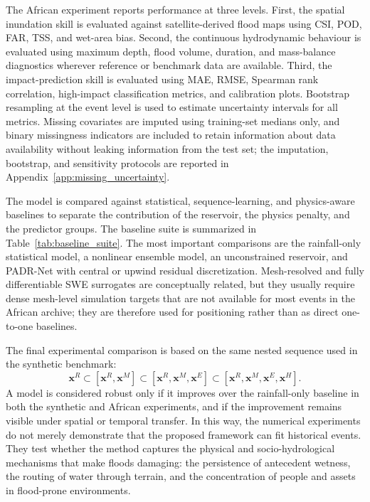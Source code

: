 \documentclass[pdflatex,sn-mathphys-ay]{sn-jnl}
\theoremstyle{thmstyleone}
\begin{document}
The African experiment reports performance at three levels.  First, the
spatial inundation skill is evaluated against satellite-derived flood
maps using CSI, POD, FAR, TSS, and wet-area bias.  Second, the
continuous hydrodynamic behaviour is evaluated using maximum depth,
flood volume, duration, and mass-balance diagnostics wherever reference
or benchmark data are available.  Third, the impact-prediction skill is
evaluated using MAE, RMSE, Spearman rank correlation, high-impact
classification metrics, and calibration plots.  Bootstrap resampling at
the event level is used to estimate uncertainty intervals for all
metrics.  Missing covariates are imputed using training-set medians
only, and binary missingness indicators are included to retain
information about data availability without leaking information from
the test set; the imputation, bootstrap, and sensitivity protocols are
reported in Appendix~\ref{app:missing_uncertainty}.

The model is compared against statistical, sequence-learning, and
physics-aware baselines to separate the contribution of the reservoir,
the physics penalty, and the predictor groups.  The baseline suite is
summarized in Table~\ref{tab:baseline_suite}.  The most important
comparisons are the rainfall-only statistical model, a nonlinear
ensemble model, an unconstrained reservoir, and PADR-Net with central
or upwind residual discretization.  Mesh-resolved and fully
differentiable SWE surrogates are conceptually related, but they
usually require dense mesh-level simulation targets that are not
available for most events in the African archive; they are therefore
used for positioning rather than as direct one-to-one baselines.

The final experimental comparison is based on the same nested sequence
used in the synthetic benchmark:
\begin{equation}
  \mathbf{x}^{R}
  \subset
  [
    \mathbf{x}^{R},
    \mathbf{x}^{M}
  ]
  \subset
  [
    \mathbf{x}^{R},
    \mathbf{x}^{M},
    \mathbf{x}^{E}
  ]
  \subset
  [
    \mathbf{x}^{R},
    \mathbf{x}^{M},
    \mathbf{x}^{E},
    \mathbf{x}^{H}
  ].
  \label{eq:africa_nested_sequence}
\end{equation}
A model is considered robust only if it improves over the rainfall-only
baseline in both the synthetic and African experiments, and if the
improvement remains visible under spatial or temporal transfer.  In
this way, the numerical experiments do not merely demonstrate that the
proposed framework can fit historical events.  They test whether the
method captures the physical and socio-hydrological mechanisms that
make floods damaging: the persistence of antecedent wetness, the
routing of water through terrain, and the concentration of people and
assets in flood-prone environments.
\end{document}
